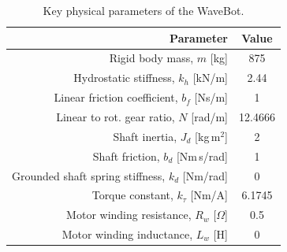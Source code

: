 \documentclass[lettersize,journal]{IEEEtran}
\begin{document}
\begin{table}[tb]
        \caption{Key physical parameters of the WaveBot.}
        \label{tab:wec_phyiscal_params}
        \centering

        \begin{tabular}{rc}
        \hline

        \hline
        \textbf{Parameter} & \textbf{Value} \\
        \hline
        Rigid body mass, $m$ [kg]                       & 875 \\
        Hydrostatic stiffness, $k_h$ [kN/m]             & 2.44 \\
        Linear friction coefficient, $b_f$ [Ns/m]       & 1 \\ %
        Linear to rot. gear ratio, $N$ [rad/m]          & 12.4666 \\
        Shaft inertia, $J_d$ [kg\,m$^2$]                & 2 \\ %
        Shaft friction, $b_d$ [Nm\,s/rad]               & 1 \\ %
        Grounded shaft spring stiffness, $k_d$ [Nm/rad] & 0 \\ %
        Torque constant, $k_\tau$ [Nm/A]                & 6.1745 \\
        Motor winding resistance, $R_w$ [$\Omega$]      & 0.5 \\
        Motor winding inductance, $L_w$ [H]             & 0 \\
        \hline

        \hline
        \end{tabular}
\end{table}

\end{document}
